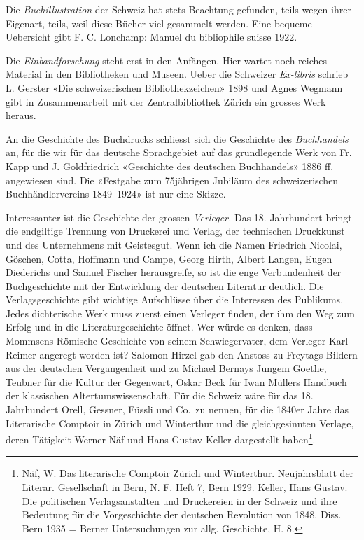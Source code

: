 \documentclass[a4paper,
fontsize=11pt,
oneside,
numbers=noperiodatend,
parskip=half-,
bibliography=totoc,
final
]{scrartcl}
\begin{document}
Die \emph{Buchillustration} der Schweiz hat stets Beachtung gefunden,
teils wegen ihrer Eigenart, teils, weil diese Bücher viel gesammelt
werden. Eine bequeme Uebersicht gibt F. C. Lonchamp: Manuel du
bibliophile suisse 1922.

Die \emph{Einbandforschung} steht erst in den Anfängen. Hier wartet noch
reiches Material in den Bibliotheken und Museen. Ueber die Schweizer
\emph{Ex-libris} schrieb L. Gerster «Die schweizerischen
Bibliothekzeichen» 1898 und Agnes Wegmann gibt in Zusammenarbeit mit der
Zentralbibliothek Zürich ein grosses Werk heraus.

An die Geschichte des Buchdrucks schliesst sich die Geschichte des
\emph{Buchhandels} an, für die wir für das deutsche Sprachgebiet auf das
grundlegende Werk von Fr. Kapp und J. Goldfriedrich «Geschichte des
deutschen Buchhandels» 1886 ff. angewiesen sind. Die «Festgabe zum
75jährigen Jubiläum des schweizerischen Buchhändlervereins 1849--1924»
ist nur eine Skizze.

Interessanter ist die Geschichte der grossen \emph{Verleger.} Das 18.
Jahrhundert bringt die endgiltige Trennung von Druckerei und Verlag, der
technischen Druckkunst und des Unternehmens mit Geistesgut. Wenn ich die
Namen Friedrich Nicolai, Göschen, Cotta, Hoffmann und Campe, Georg
Hirth, Albert Langen, Eugen Diederichs und Samuel Fischer herausgreife,
so ist die enge Verbundenheit der Buchgeschichte mit der Entwicklung der
deutschen Literatur deutlich. Die Verlagsgeschichte gibt wichtige
Aufschlüsse über die Interessen des Publikums. Jedes dichterische Werk
muss zuerst einen Verleger finden, der ihm den Weg zum Erfolg und in die
Literaturgeschichte öffnet. Wer würde es denken, dass Mommsens Römische
Geschichte von seinem Schwiegervater, dem Verleger Karl Reimer angeregt
worden ist? Salomon Hirzel gab den Anstoss zu Freytags Bildern aus der
deutschen Vergangenheit und zu Michael Bernays Jungem Goethe, Teubner
für die Kultur der Gegenwart, Oskar Beck für Iwan Müllers Handbuch der
klassischen Altertumswissenschaft. Für die Schweiz wäre für das 18.
Jahrhundert Orell, Gessner, Füssli und Co.~zu nennen, für die 1840er
Jahre das Literarische Comptoir in Zürich und Winterthur und die
gleichgesinnten Verlage, deren Tätigkeit Werner Näf und Hans Gustav
Keller dargestellt haben\footnote{Näf, W. Das literarische Comptoir
  Zürich und Winterthur. Neujahrsblatt der Literar. Gesellschaft in
  Bern, N. F. Heft 7, Bern 1929. Keller, Hans Gustav. Die politischen
  Verlagsanstalten und Druckereien in der Schweiz und ihre Bedeutung für
  die Vorgeschichte der deutschen Revolution von 1848. Diss. Bern 1935 =
  Berner Untersuchungen zur allg. Geschichte, H. 8.}.
\end{document}
